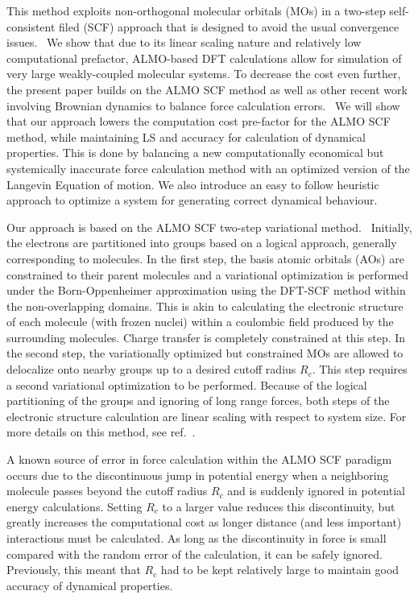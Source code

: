 \documentclass[10pt,aps,prl,twocolumn,amsmath,amssymb,superscriptaddress,longbibliography]{revtex4-1}
\begin{document}
This method exploits non-orthogonal molecular orbitals (MOs) in a two-step self-consistent filed (SCF) approach that is designed to avoid the usual convergence issues.~\cite{a:ls-mauri-galli-car-1993,a:ls-ordejon-1995,a:ls-fattebert-2004,a:ls-rev-1999} 
We show that due to its linear scaling nature and relatively low computational prefactor, ALMO-based DFT calculations allow for simulation of very large weakly-coupled molecular systems. 
To decrease the cost even further, the present paper builds on the ALMO SCF method as well as other recent work involving Brownian dynamics to balance force calculation errors.~\cite{a:ls-parinello,a:2ndcpmd,a:langevin-why} 
We will show that our approach lowers the computation cost pre-factor for the ALMO SCF method, while maintaining LS and accuracy for calculation of dynamical properties. 
This is done by balancing a new computationally economical but systemically inaccurate force calculation method with an optimized version of the Langevin Equation of motion. 
We also introduce an easy to follow heuristic approach to optimize a system for generating correct dynamical behaviour.


Our approach is based on the ALMO SCF two-step variational method.~\cite{a:almo-ls} 
Initially, the electrons are partitioned into groups based on a logical approach, generally corresponding to molecules. 
In the first step, the basis atomic orbitals (AOs) are constrained to their parent molecules and a variational optimization is performed under the Born-Oppenheimer approximation using the DFT-SCF method within the non-overlapping domains. 
This is akin to calculating the electronic structure of each molecule (with frozen nuclei) within a coulombic field produced by the surrounding molecules. 
Charge transfer is completely constrained at this step. 
In the second step, the variationally optimized but constrained MOs are allowed to delocalize onto nearby groups up to a desired cutoff radius $R_{c}$. 
This step requires a second variational optimization to be performed. 
Because of the logical partitioning of the groups and ignoring of long range forces, both steps of the electronic structure calculation are linear scaling with respect to system size. 
For more details on this method, see ref.\ .

A known source of error in force calculation within the ALMO SCF paradigm occurs due to the discontinuous jump in potential energy when a neighboring molecule passes beyond the cutoff radius $R_{c}$ and is suddenly ignored in potential energy calculations. 
Setting $R_{c}$ to a larger value reduces this discontinuity, but greatly increases the computational cost as longer distance (and less important) interactions must be calculated. 
As long as the discontinuity in force is small compared with the random error of the calculation, it can be safely ignored. Previously, this meant that $R_{c}$ had to be kept relatively large to maintain good accuracy of dynamical properties.
\end{document}

